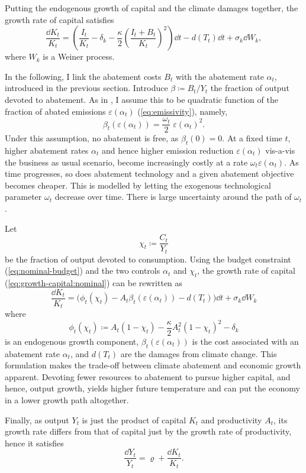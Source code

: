 \documentclass[../../main.tex]{subfiles}
\begin{document}
Putting the endogenous growth of capital and the climate damages together, the growth rate of capital satisfies \begin{equation} \label{eq:growth-capital:nominal}
    \frac{\dd{K}_t}{K_t} = \left(\frac{I_t}{K_t} - \delta_k - \frac{\kappa}{2} \left( \frac{I_t + B_t}{K_t} \right)^2 \right) \dd{t} - d(T_t) \dd{t} + \sigma_k \dd{W}_k,
\end{equation} where $W_k$ is a Weiner process.

In the following, I link the abatement costs $B_t$ with the abatement rate $\alpha_t$, introduced in the previous section. Introduce $\beta \coloneqq B_t / Y_t$ the fraction of output devoted to abatement. As in \cite{nordhaus_optimal_1992}, I assume this to be quadratic function of the fraction of abated emissions $\varepsilon(\alpha_t)$ (\ref{eq:emissivity}), namely, \begin{equation} \label{eq:abatement-costs}
    \beta_t(\varepsilon(\alpha_t)) = \frac{\omega_t}{2} \; \varepsilon(\alpha_t)^2.
\end{equation} Under this assumption, no abatement is free, as $\beta_t(0) = 0$. At a fixed time $t$, higher abatement rates $\alpha_t$ and hence higher emission reduction $\varepsilon(\alpha_t)$ vis-a-vis the business as usual scenario, become increasingly costly at a rate $\omega_t \varepsilon(\alpha_t)$. As time progresses, so does abatement technology and a given abatement objective becomes cheaper. This is modelled by letting the exogenous technological parameter $\omega_t$ decrease over time. There is large uncertainty around the path of $\omega_t$. %

Let \begin{equation}
    \chi_t \coloneqq \frac{C_t}{Y_t}
\end{equation} be the fraction of output devoted to consumption. Using the budget constraint (\ref{eq:nominal-budget}) and the two controls $\alpha_t$ and $\chi_t$, the growth rate of capital (\ref{eq:growth-capital:nominal}) can be rewritten as \begin{equation}
    \frac{\dd{K_t}}{K_t} = \Big(\phi_t(\chi_t) - A_t \beta_t(\varepsilon(\alpha_t)) - d(T_t) \Big) \dd{t} + \sigma_k \dd{W}_k
\end{equation} where \begin{equation}
    \phi_t(\chi_t) \coloneqq A_t (1 - \chi_t) - \frac{\kappa}{2} A_t^2 (1 - \chi_t)^2 - \delta_k
\end{equation} is an endogenous growth component, $\beta_t(\varepsilon(\alpha_t))$ is the cost associated with an abatement rate $\alpha_t$, and $d(T_t)$ are the damages from climate change. This formulation makes the trade-off between climate abatement and economic growth apparent. Devoting fewer resources to abatement to pursue higher capital, and hence, output growth, yields higher future temperature and can put the economy in a lower growth path altogether.

Finally, as output $Y_t$ is just the product of capital $K_t$ and productivity $A_t$, its growth rate differs from that of capital just by the growth rate of productivity, hence it satisfies \begin{equation}
    \frac{\dd{Y}_t}{Y_t} = \varrho + \frac{\dd{K}_t}{K_t}. 
\end{equation}
\end{document}
